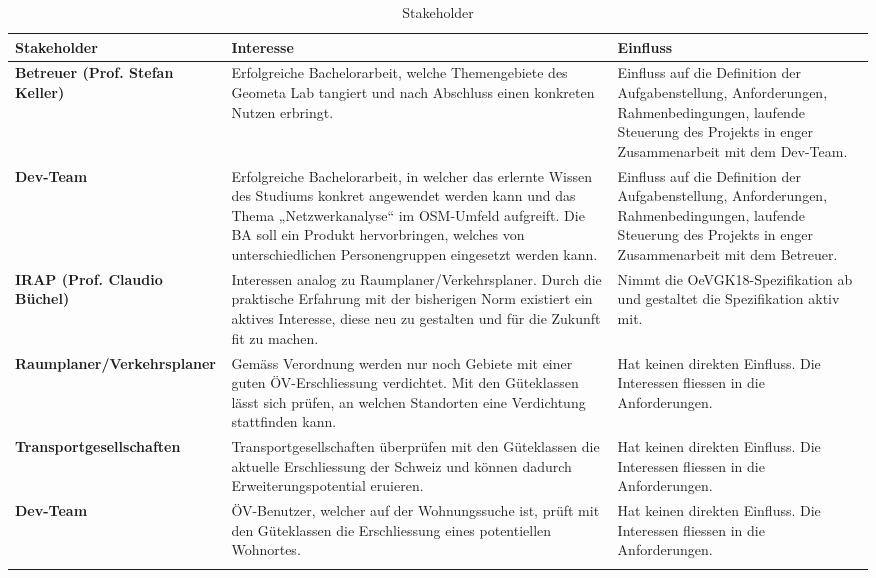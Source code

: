 \begin{landscape}
\begin{longtable}{l p{9cm} p{9cm}}
        \toprule
        \textbf{Stakeholder}
                                & \textbf{Interesse}
                                & \textbf{Einfluss} \\
        \midrule
        \textbf{Betreuer (Prof. Stefan Keller)}
                                & Erfolgreiche Bachelorarbeit, welche Themengebiete des Geometa Lab tangiert und nach Abschluss einen konkreten Nutzen erbringt.
                                & Einfluss auf die Definition der Aufgabenstellung, Anforderungen, Rahmenbedingungen, laufende Steuerung des Projekts in enger Zusammenarbeit mit dem Dev-Team. \\
        \textbf{Dev-Team}
                                & Erfolgreiche Bachelorarbeit, in welcher das erlernte Wissen des Studiums konkret angewendet werden kann und das Thema „Netzwerkanalyse“ im OSM-Umfeld aufgreift. Die BA soll ein Produkt hervorbringen, welches von unterschiedlichen Personengruppen eingesetzt werden kann.
                                & Einfluss auf die Definition der Aufgabenstellung, Anforderungen,  Rahmenbedingungen, laufende Steuerung des Projekts in enger Zusammenarbeit mit dem Betreuer. \\                                
        \textbf{IRAP (Prof. Claudio Büchel)}
                                & Interessen analog zu Raumplaner/Verkehrsplaner. Durch die praktische Erfahrung mit der bisherigen Norm existiert ein aktives Interesse, diese neu zu gestalten und für die Zukunft fit zu machen.
                                & Nimmt die \gls{OeVGK18}-Spezifikation ab und gestaltet die Spezifikation aktiv mit. \\
        \textbf{Raumplaner/Verkehrsplaner}
                                & Gemäss Verordnung werden nur noch Gebiete mit einer guten ÖV-Erschliessung verdichtet. Mit den Güteklassen lässt sich prüfen, an welchen Standorten eine Verdichtung stattfinden kann.
                                & Hat keinen direkten Einfluss. Die Interessen fliessen in die Anforderungen. \\     
        \textbf{Transportgesellschaften}
                                & Transportgesellschaften überprüfen mit den Güteklassen die aktuelle Erschliessung der Schweiz und können dadurch Erweiterungspotential eruieren.
                                & Hat keinen direkten Einfluss. Die Interessen fliessen in die Anforderungen. \\       
        \textbf{Dev-Team}
                                & ÖV-Benutzer, welcher auf der Wohnungssuche ist, prüft mit den Güteklassen die Erschliessung eines potentiellen Wohnortes.
                                & Hat keinen direkten Einfluss. Die Interessen fliessen in die Anforderungen. \\                                                   
        \bottomrule
    \caption{Stakeholder}
    \label{table:Stakeholder}
\end{longtable}
\end{landscape}

